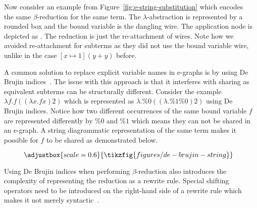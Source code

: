 \documentclass[peerreviewcls]{IEEEtran}
\begin{document}
Now consider an example from Figure~\ref{fig:e-string-substitution} which encodes the same $\beta$-reduction for the same term.
The $\lambda$-abstraction is represented by a rounded box and the bound variable is the dangling wire.
The application node is depicted as 
. 
The reduction is just the re-attachment of wires.
Note how we avoided re-attachment for subterms as they did not use the bound variable wire, unlike in the case $[x \mapsto 1](y+y)$ before.

A common solution to replace explicit variable names in e-graphs is by using De Brujin indices~\cite{koehler2022sketchguided}.
The issue with this approach is that it interferes with sharing as equivalent subterms can be structurally different.
Consider the example $\lambda f . f ((\lambda x . f x) 2)$ which is represented as $\lambda . \%0 ((\lambda . \%1 \%0) 2)$ using De Brujin indices.
Notice how two different occurrences of the same bound variable $f$ are represented differently by $\%0$ and $\%1$ which means they can not be shared in an e-graph.
A string diagrammatic representation of the same term makes it possible for $f$ to be shared as demonstrated below.

\[
\adjustbox{scale=0.6}{
    \tikzfig{figures/de-brujin-string}
}
\]

Using De Brujin indices when performing $\beta$-reduction also introduces the complexity of representing the reduction as a rewrite rule.
Special shifting operators need to be introduced on the right-hand side of a rewrite rule which makes it not merely syntactic~\cite{koehler2022sketchguided}.
\end{document}
